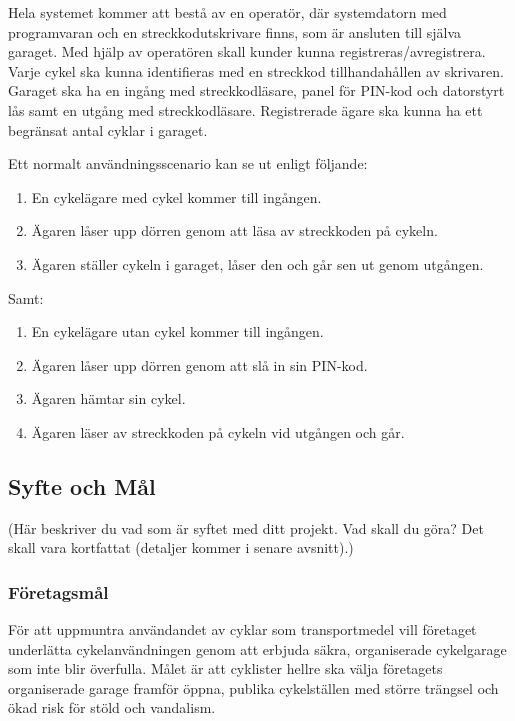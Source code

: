 \documentclass[a4paper]{article}
\begin{document}
Hela systemet kommer att bestå av en operatör, där systemdatorn med programvaran och 
en streckkodutskrivare finns, som är ansluten till själva garaget. Med hjälp av operatören 
skall kunder kunna registreras/avregistrera. Varje cykel ska kunna identifieras med en 
streckkod tillhandahållen av skrivaren. Garaget ska ha en ingång med streckkodläsare, panel för 
PIN-kod och datorstyrt lås samt en utgång med streckkodläsare. Registrerade ägare ska kunna ha
 ett begränsat antal cyklar i garaget.

Ett normalt användningsscenario kan se ut enligt följande:

\begin{enumerate}
\item En cykelägare med cykel kommer till ingången.
\item Ägaren låser upp dörren genom att läsa av streckkoden på cykeln.
\item Ägaren ställer cykeln i garaget, låser den och går sen ut genom utgången.
\end{enumerate}

Samt:

\begin{enumerate}
\item En cykelägare utan cykel kommer till ingången.
\item Ägaren låser upp dörren genom att slå in sin PIN-kod.
\item Ägaren hämtar sin cykel.
\item Ägaren läser av streckkoden på cykeln vid utgången och går.
\end{enumerate}


\subsection{Syfte och Mål} %
(Här beskriver du vad som är syftet med ditt projekt. Vad skall du göra? Det skall vara kortfattat (detaljer kommer i senare avsnitt).)


\subsubsection{Företagsmål}
För att uppmuntra användandet av cyklar som transportmedel vill företaget underlätta cykelanvändningen
 genom att erbjuda säkra, organiserade cykelgarage som inte blir överfulla. Målet är att cyklister hellre
 ska välja företagets organiserade garage framför öppna, publika cykelställen med större trängsel och
 ökad risk för stöld och vandalism.
\end{document}
